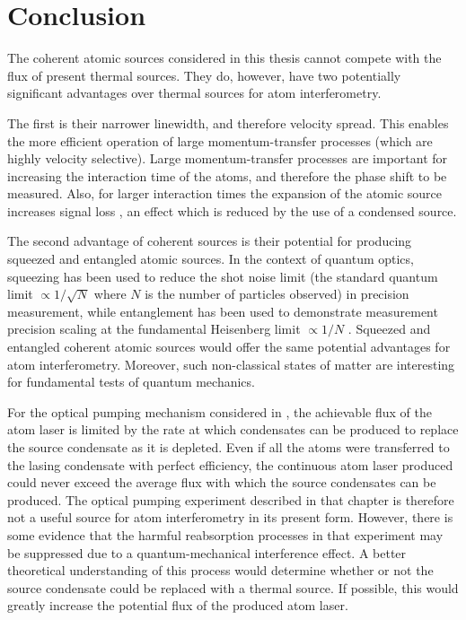 \chapter{Conclusion}
\label{Conclusion}
\graphicspath{{Figures/Conclusion/}{Figures/Common/}}

The coherent atomic sources considered in this thesis cannot compete with the flux of present thermal sources.  They do, however, have two potentially significant advantages over thermal sources for atom interferometry.

The first is their narrower linewidth, and therefore velocity spread.  This enables the more efficient operation of large momentum-transfer processes (which are highly velocity selective).  Large momentum-transfer processes are important for increasing the interaction time of the atoms, and therefore the phase shift to be measured.  Also, for larger interaction times the expansion of the atomic source increases signal loss \citep{Dimopoulos:2007uq}, an effect which is reduced by the use of a condensed source.

The second advantage of coherent sources is their potential for producing squeezed and entangled atomic sources.  In the context of quantum optics, squeezing has been used to reduce the shot noise limit (the standard quantum limit $\propto 1/\sqrt{N}$ where $N$ is the number of particles observed) in precision measurement, while entanglement has been used to demonstrate measurement precision scaling at the fundamental Heisenberg limit $\propto 1/N$ \citep{Leibfried:2004}.  Squeezed and entangled coherent atomic sources would offer the same potential advantages for atom interferometry.  Moreover, such non-classical states of matter are interesting for fundamental tests of quantum mechanics.



For the optical pumping mechanism considered in , the achievable flux of the atom laser is limited by the rate at which condensates can be produced to replace the source condensate as it is depleted.  Even if all the atoms were transferred to the lasing condensate with perfect efficiency, the continuous atom laser produced could never exceed the average flux with which the source condensates can be produced.  The optical pumping experiment described in that chapter is therefore not a useful source for atom interferometry in its present form.  However, there is some evidence that the harmful reabsorption processes in that experiment may be suppressed due to a quantum-mechanical interference effect.  A better theoretical understanding of this process would determine whether or not the source condensate could be replaced with a thermal source.  If possible, this would greatly increase the potential flux of the produced atom laser.


